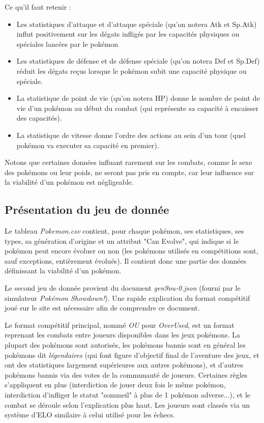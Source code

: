 \documentclass[a4paper,12pt]{article}
\begin{document}
Ce qu'il faut retenir :
\begin{itemize}
    \item Les statistiques d'attaque et d'attaque spéciale (qu'on notera Atk et
    Sp.Atk) influt positivement sur les dégats infligés par les capacités
    physiques ou spéciales lancées par le pokémon
    \item Les statistiques de défense et de défense spéciale (qu'on notera Def
    et Sp.Def) réduit les dégats reçus lorsque le pokémon subit une capacité
    physique ou spéciale.
    \item La statistique de point de vie (qu'on notera HP) donne le nombre de
    point de vie d'un pokémon au début du combat (qui représente sa capacité à
    encaisser des capacités).
    \item La statistique de vitesse donne l'ordre des actions au sein d'un tour
    (quel pokémon va executer sa capacité en premier).
\end{itemize}

Notons que certaines données influant rarement sur les combats, comme le sexe
des pokémons ou leur poids, ne seront pas pris en compte, car leur influence sur
la viabilité d'un pokémon est négligeable.

\subsection{Présentation du jeu de donnée}
Le tableau \textit{Pokemon.csv} contient, pour chaque pokémon, ses statistiques,
ses types, sa génération d'origine et un attribut "Can Evolve", qui indique si
le pokémon peut encore évoluer ou non (les pokémons utilisés en compétitions
sont, sauf exceptions, entièrement évolués). Il contient donc une partie des
données définissant la viabilité d'un pokémon.

Le second jeu de donnée provient du document \textit{gen9ou-0.json} (fourni par
le simulateur \textit{Pokémon Showdown!}). Une rapide explication du format
compétitif joué sur le site est nécessaire afin de comprendre ce document.

Le format compétitif principal, nommé \textit{OU} pour \textit{OverUsed}, est un
format reprenant les combats entre joueurs disponibles dans les jeux pokémons.
La plupart des pokémons sont autorisés, les pokémons bannis sont en général les
pokémons dit \textit{légendaires} (qui font figure d'objectif final de
l'aventure des jeux, et ont des statistiques largement supérieures aux autres
pokémons), et d'autres pokémons bannis via des votes de la communauté de
joueurs. Certaines règles s'appliquent en plus (interdiction de jouer deux fois
le même pokémon, interdiction d'infliger le statut "sommeil" à plus de 1 pokémon
adverse...), et le combat se déroule selon l'explication plus haut. Les joueurs
sont classés via un système d'ELO similaire à celui utilisé pour les échecs.
\end{document}
